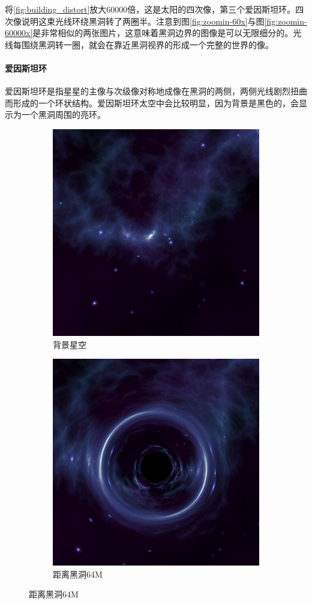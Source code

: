 将\ref{fig:building_distort}放大60000倍，这是太阳的四次像，第三个爱因斯坦环。四次像说明这束光线环绕黑洞转了两圈半。注意到图\ref{fig:zoomin-60x}与图\ref{fig:zoomin-60000x}是非常相似的两张图片，这意味着黑洞边界的图像是可以无限细分的。光线每围绕黑洞转一圈，就会在靠近黑洞视界的形成一个完整的世界的像。

\paragraph{爱因斯坦环}
爱因斯坦环是指星星的主像与次级像对称地成像在黑洞的两侧，两侧光线剧烈扭曲而形成的一个环状结构。爱因斯坦环太空中会比较明显，因为背景是黑色的，会显示为一个黑洞周围的亮环。
\begin{figure}[H]
    \centering
    \begin{subfigure}{.5\textwidth}
        \centering
        \includegraphics[width=.8\linewidth]{images/no_ring.png}
        \caption{背景星空}
        \label{fig:no-ring}
    \end{subfigure}%
    \begin{subfigure}{.5\textwidth}
        \centering
        \includegraphics[width=.8\linewidth]{images/einstein_ring.png}
        \caption{距离黑洞64M}
        \label{fig:einstein-ring}
    \end{subfigure}
\end{figure}
